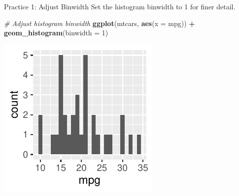 \documentclass[
  ignorenonframetext,
]{beamer}
\newenvironment{Shaded}{\begin{snugshade}}{\end{snugshade}}
\newcommand{\AttributeTok}[1]{\textcolor[rgb]{0.13,0.29,0.53}{#1}}
\newcommand{\CommentTok}[1]{\textcolor[rgb]{0.56,0.35,0.01}{\textit{#1}}}
\newcommand{\DecValTok}[1]{\textcolor[rgb]{0.00,0.00,0.81}{#1}}
\newcommand{\FunctionTok}[1]{\textcolor[rgb]{0.13,0.29,0.53}{\textbf{#1}}}
\newcommand{\NormalTok}[1]{#1}
\newcommand{\SpecialCharTok}[1]{\textcolor[rgb]{0.81,0.36,0.00}{\textbf{#1}}}
\begin{document}
\begin{frame}[fragile]{Practice 1: Adjust Binwidth}
\label{practice-1-adjust-binwidth}
Set the histogram binwidth to 1 for finer detail.


\begin{Shaded}
\begin{Highlighting}[]
\CommentTok{\# Adjust histogram binwidth}
\FunctionTok{ggplot}\NormalTok{(mtcars, }\FunctionTok{aes}\NormalTok{(}\AttributeTok{x =}\NormalTok{ mpg)) }\SpecialCharTok{+} \FunctionTok{geom\_histogram}\NormalTok{(}\AttributeTok{binwidth =} \DecValTok{1}\NormalTok{)}
\end{Highlighting}
\end{Shaded}

\begin{center}\includegraphics[width=0.5\linewidth]{Figs/unnamed-chunk-38-1} \end{center}
\end{frame}
\end{document}
